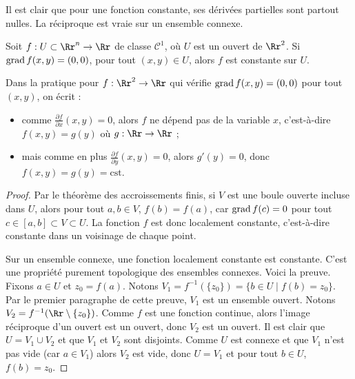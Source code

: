 \documentclass[12pt, class=report,crop=false]{standalone}
\begin{document}
 
Il est clair que pour une fonction constante, ses dérivées partielles sont partout nulles. La réciproque est vraie sur un ensemble connexe.
 
\begin{corollaire}
Soit $f: U \subset \Rr^n \rightarrow \Rr$ de classe $\mathcal{C}^1$, o\`u $U$ est un ouvert  de $\Rr^2$.
Si $\operatorname{grad} f (x,y) = (0,0)$, pour tout $(x,y) \in U$, alors $f$ est constante sur $U$.
\end{corollaire}


Dans la pratique pour $f : \Rr^2 \to \Rr$ qui vérifie $\operatorname{grad} f (x,y) = (0,0)$ pour tout $(x,y)$, on écrit :
\begin{itemize}
  \item comme  $\frac{\partial f}{\partial x}(x,y) = 0$, alors $f$ ne dépend pas de la variable $x$, c'est-à-dire $f(x,y) = g(y)$ où $g : \Rr \to \Rr$ ;
  \item mais comme en plus $\frac{\partial f}{\partial y}(x,y) = 0$, alors $g'(y) = 0$, donc $f(x,y)= g(y) = \text{cst}$.
\end{itemize}


\begin{proof}
Par le théorème des accroissements finis, si $V$ est une boule ouverte incluse dans $U$, alors pour tout $a,b \in V$, $f(b) = f(a)$, car $\operatorname{grad} f (c) = 0$ pour tout $c\in [a,b] \subset V \subset U$. La fonction $f$ est donc localement constante, c'est-à-dire constante dans un voisinage de chaque point.

Sur un ensemble connexe, une fonction localement constante est constante. C'est une propriété purement topologique des ensembles connexes. Voici la preuve.
Fixons $a \in U$ et $z_0 = f(a)$. Notons $V_1 = f^{-1}(\{z_0\}) = \{ b \in U \mid f(b)= z_0\}$. Par le premier paragraphe de cette preuve, $V_1$ est un ensemble ouvert. Notons $V_2 = f^{-1} ( \Rr \setminus \{z_0\} )$. Comme $f$ est une fonction continue, alors l'image réciproque d'un ouvert est un ouvert, donc $V_2$ est un ouvert. Il est clair que $U = V_1 \cup V_2$ et que $V_1$ et $V_2$ sont disjoints.
Comme $U$ est connexe et que $V_1$ n'est pas vide (car $a \in V_1$) alors $V_2$ est vide, donc $U=V_1$ et pour tout $b\in U$, $f(b)= z_0$.
\end{proof}
\end{document}
